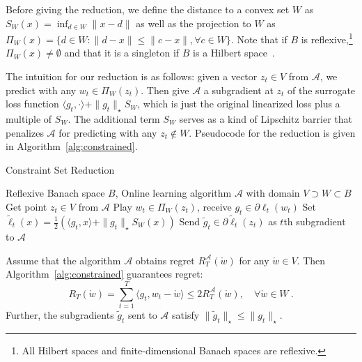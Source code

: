 \documentclass[12pt]{colt2018} %
\newcommand{\ol}{\mathcal{A}}
\newcommand{\w}{\mathring{w}}
\begin{document}
Before giving the reduction, we define the distance to a convex set $W$ as $S_W(x) = \inf_{d \in W} \|x-d\|$ as well as the projection to $W$ as $\Pi_W(x)=\{ d \in W: \|d-x\|\leq \|c-x\|, \forall c \in W\}$. Note that if $B$ is reflexive,\footnote{All Hilbert spaces and finite-dimensional Banach spaces are reflexive.} $\Pi_W(x)\neq \emptyset$ and that it is a singleton if $B$ is a Hilbert space~\cite[Exercise 4.1.4]{Lucchetti06}.

The intuition for our reduction is as follows: given a vector $z_t\in V$ from $\ol$, we predict with any $w_t\in \Pi_W(z_t)$. Then give $\ol$ a subgradient at $z_t$ of the surrogate loss function $\langle g_t,\cdot\rangle + \|g_t\|_\star S_W$, which is just the original linearized loss plus a multiple of $S_W$. The additional term $S_W$ serves as a kind of Lipschitz barrier that penalizes $\ol$ for predicting with any $z_t\notin W$. Pseudocode for the reduction is given in Algorithm~\ref{alg:constrained}.

\begin{algorithm}[h]
   \caption{Constraint Set Reduction}
   \label{alg:constrained}
\begin{algorithmic}[1]
   \REQUIRE Reflexive Banach space $B$, Online learning algorithm $\ol$ with domain $V\supset W\subset B$
   \STATE Get point $z_t\in V$ from $\ol$
   \STATE Play $w_t \in \Pi_W(z_t)$, receive $g_t \in \partial \ell_t(w_t)$
   \STATE Set $\tilde \ell_t(x) = \tfrac{1}{2}\left(\langle g_t, x\rangle + \|g_t\|_\star S_W(x)\right)$
   \STATE Send $\tilde g_t\in \partial \tilde \ell_t(z_t)$ as $t$th subgradient to $\ol$
   \ENDFOR
\end{algorithmic}
\end{algorithm}

\begin{theorem}\label{thm:constrained}
Assume that the algorithm $\ol$ obtains regret $R^{\ol}_T(\w)$ for any $\w \in V$. Then  Algorithm~\ref{alg:constrained} guarantees regret:
\[
R_T(\w)=\sum_{t=1}^T \langle g_t, w_t -  \w\rangle \leq 2R^{\ol}_T(\w), \quad \forall \w \in W~.
\]
Further, the subgradients $\tilde g_t$ sent to $\ol$ satisfy $\|\tilde g_t\|_\star\le \|g_t\|_\star$.
\end{theorem}
\end{document}
